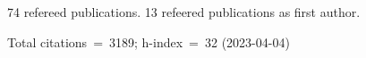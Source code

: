 74 refereed publications. 13 refeered publications as first author.

Total citations~=~3189; h-index~=~32 (2023-04-04)